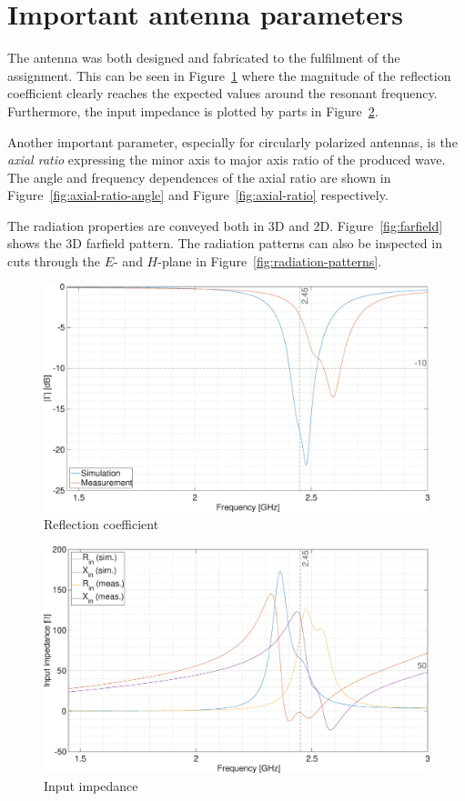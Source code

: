\documentclass[11pt,a4paper]{article}
\begin{document}
    \section{Important antenna parameters}
        The antenna was both designed and fabricated to the fulfilment of the assignment. This can be seen in Figure~\ref{fig:reflection-coefficient} where the magnitude of the reflection coefficient clearly reaches the expected values around the resonant frequency. Furthermore, the input impedance is plotted by parts in Figure~\ref{fig:input-impedance}.

        Another important parameter, especially for circularly polarized antennas, is the \emph{axial ratio} expressing the minor axis to major axis ratio of the produced wave. The angle and frequency dependences of the axial ratio are shown in Figure~\ref{fig:axial-ratio-angle} and Figure~\ref{fig:axial-ratio} respectively.
        
        The radiation properties are conveyed both in 3D and 2D. Figure~\ref{fig:farfield} shows the 3D farfield pattern. The radiation patterns can also be inspected in cuts through the $E$- and $H$-plane in Figure~\ref{fig:radiation-patterns}.
\newpage
        \begin{figure}[!ht]
            \centering
            \includegraphics[width=.8\textwidth]{src/reflection-coefficient.eps}
            \caption{\label{fig:reflection-coefficient}Reflection coefficient}
        \end{figure}

        \begin{figure}[!ht]
            \centering
            \includegraphics[width=.8\textwidth]{src/input-impedance.eps}
            \caption{\label{fig:input-impedance}Input impedance}
        \end{figure}
\end{document}
